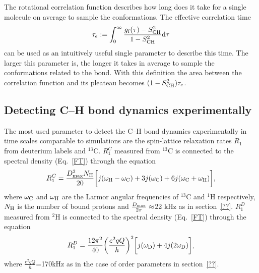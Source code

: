 \documentclass[aps,prl,superscriptaddress,twocolumn]{revtex4}
\begin{document}
The rotational correlation function describes how long does it take for a single molecule
on average to sample the conformations. The effective correlation time 
\begin{equation}\label{effCTdef}
\tau_{e}:=\int_0^{\infty} \frac{g_{\rm{f}}(\tau)-S_{\rm{CH}}^2}{1-S_{\rm{CH}}^2} \mathrm{d}\tau
\end{equation} 
can be used as an intuitively useful single parameter to describe this time. 
The larger this parameter is, the longer it takes in average to sample the conformations related to the
bond. With this definition the area between the correlation function and its pleateau becomes $(1-S_{\rm{CH}}^2)\tau_{e}$.

\subsection{Detecting C--H bond dynamics experimentally}

The most used parameter to detect the C--H bond dynamics experimentally in time scales comparable to simulations
are the spin-lattice relaxation rates $R_1$ from deuterium labels and $^{13}$C. 
$R_1^{C}$ measured from $^{13}$C is connected to the spectral density (Eq.~\ref{FT}) through the equation
\begin{equation}\label{R1C}
R_{1}^{C}=\frac{D_{\rm{max}}^2N_{\rm{H}}}{20}\bigg[j(\omega_{\rm{H}}-\omega_{\rm{C}})+3j(\omega_{\rm{C}})+6j(\omega_{\rm{C}}+\omega_{\rm{H}})\bigg],
\end{equation}
where $\omega_{\rm{C}}$ and $\omega_{\rm{H}}$ are the Larmor angular frequencies of $^{13}$C and $^1$H respectively, 
$N_{\rm{H}}$ is the number of bound protons and $\frac{D_{\rm{max}}}{2\pi}\approx$22 kHz as in section~\ref{??}.
$R_1^{D}$ measured from $^2$H is connected to the spectral density (Eq.~\ref{FT}) through the equation
\begin{equation}\label{R1D}
R_{1}^{D}=\frac{12\pi^2}{40}\bigg(\frac{e^2qQ}{h}\bigg)^2\bigg[j(\omega_{\rm{D}})+4j(2\omega_{\rm{D}})\bigg],
\end{equation}
where $\frac{e^2qQ}{h}$=170kHz as in the case of order parameters in section~\ref{??}.
\end{document}
